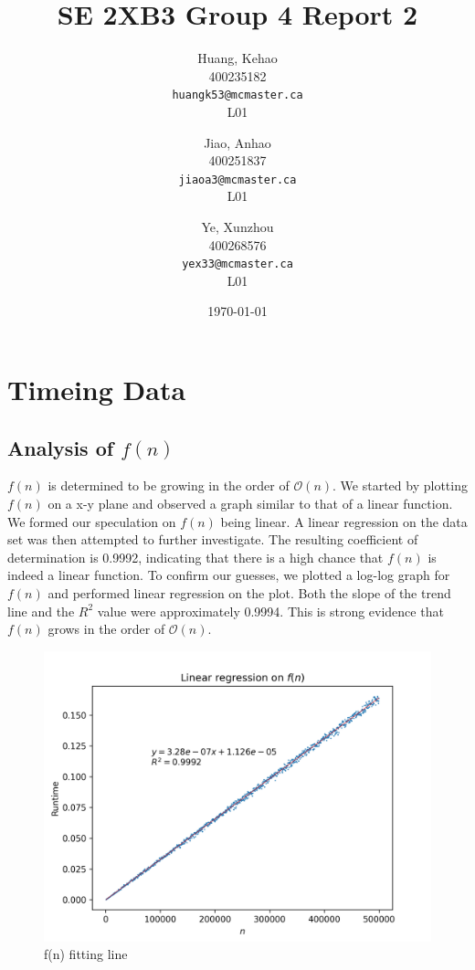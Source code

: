 \documentclass[titlepage, 12pt]{article}
\title{SE 2XB3 Group 4 Report 2}
\author{
  Huang, Kehao \\
  400235182 \\
  \texttt{huangk53@mcmaster.ca} \\
  L01
  \and
  Jiao, Anhao \\
  400251837 \\
  \texttt{jiaoa3@mcmaster.ca} \\
  L01
  \and
  Ye, Xunzhou \\
  400268576 \\
  \texttt{yex33@mcmaster.ca} \\
  L01
}
\date{\today}
\begin{document}
\maketitle{}

\newpage{}

\section{Timeing Data}

\subsection{Analysis of $f(n)$}

$f(n)$ is determined to be growing in the order of $\mathcal{O}(n)$. We started by 
plotting $f(n)$ on a x-y plane and observed a graph similar to that of 
a linear function. We formed our speculation on $f(n)$ being linear. A 
linear regression on the data set was then attempted to further 
investigate. The resulting coefficient of determination is 0.9992, 
indicating that there is a high chance that $f(n)$ is indeed a linear 
function. To confirm our guesses, we plotted a log-log graph for $f(n)$ 
and performed linear regression on the plot. Both the slope of the trend 
line and the $R^{2}$ value were approximately 0.9994. This 
is strong evidence that $f(n)$ grows in the order of $\mathcal{O}(n)$.
\begin{figure}[h]
    \includegraphics[width=\linewidth]{fn-linreg.png}
    \caption{f(n) fitting line}
\end{figure}
\end{document}
